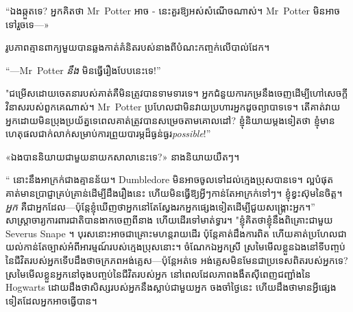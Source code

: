 “ឯងឆ្កួតទេ? អ្នកគិតថា Mr~Potter អាច - នេះគួរឱ្យអស់សំណើចណាស់។ Mr~Potter មិន​អាច​ទៅ​រួច​ទេ—»

រូបភាព​គ្មាន​ពាក្យ​មួយ​បាន​ឆ្លង​កាត់​គំនិត​របស់​នាង​ពី​បំណះ​កញ្ចក់​លើ​បាល់​ដែក។

“—Mr~Potter \emph{នឹង} មិនធ្វើរឿងបែបនេះទេ!”

"ជម្រើសដោយចេតនារបស់គាត់គឺមិនត្រូវបានទាមទារទេ។ អ្នកជំនួយការកម្រនឹងចេញដើម្បីហៅសេចក្តីវិនាសរបស់ពួកគេណាស់។ Mr~Potter ប្រហែលជាមិនវាយប្រហារអ្នកដូចព្យាបាទទេ។ តើ​គាត់​វាយ​អ្នក​ដោយ​មិន​ប្រុងប្រយ័ត្ន​ទេ​ពេល​គាត់​ត្រូវ​បាន​សម្រេច​តាម​គោលដៅ? ខ្ញុំនិយាយម្តងទៀតថា ខ្ញុំមានហេតុផលជាក់លាក់សម្រាប់ការព្រួយបារម្ភដ៏ធ្ងន់ធ្ងរ\emph{possible}!”

«ឯងបាននិយាយជាមួយនាយកសាលានេះទេ?» នាងនិយាយយឺតៗ។

“ នោះនឹងអាក្រក់ជាងគ្មានន័យ។ Dumbledore មិនអាចចូលទៅដល់ក្មេងប្រុសបានទេ។ ល្អបំផុត គាត់មានប្រាជ្ញាគ្រប់គ្រាន់ដើម្បីដឹងរឿងនេះ ហើយមិនធ្វើឱ្យអ្វីៗកាន់តែអាក្រក់ទៅៗ។ ខ្ញុំខ្វះស៊ុមនៃចិត្ត។ \emph{អ្នក} គឺជាអ្នកដែល—ប៉ុន្តែខ្ញុំឃើញថាអ្នកនៅតែស្វែងរកអ្នកផ្សេងទៀតដើម្បីជួយសង្រ្គោះអ្នក។” សាស្ត្រាចារ្យការពារជាតិបានងាកចេញពីនាង ហើយដើរទៅមាត់ទ្វារ។ "ខ្ញុំគិតថាខ្ញុំនឹងពិគ្រោះជាមួយ Severus Snape ។ បុរសនោះអាចជាគ្រោះមហន្តរាយដើរ ប៉ុន្តែគាត់ដឹងការពិត ហើយគាត់ប្រហែលជាយល់កាន់តែច្បាស់អំពីអារម្មណ៍របស់ក្មេងប្រុសនោះ។ ចំណែក​ឯ​អ្នក​ស្រី ស្រមៃ​មើល​ខ្លួន​ឯង​នៅ​ទី​បញ្ចប់​នៃ​ជីវិត​របស់​អ្នក​ទើប​ដឹង​ថា​ចក្រភព​អង់គ្លេស—ប៉ុន្តែ​អត់​ទេ អង់គ្លេស​មិន​មែន​ជា​ប្រទេស​ពិត​របស់​អ្នក​ទេ? ស្រមៃមើលខ្លួនអ្នកនៅចុងបញ្ចប់នៃជីវិតរបស់អ្នក នៅពេលដែលភាពងងឹតស៊ីពេញជញ្ជាំងនៃ Hogwarts ដោយដឹងថាសិស្សរបស់អ្នកនឹងស្លាប់ជាមួយអ្នក ចងចាំថ្ងៃនេះ ហើយដឹងថាមានអ្វីផ្សេងទៀតដែលអ្នកអាចធ្វើបាន។

